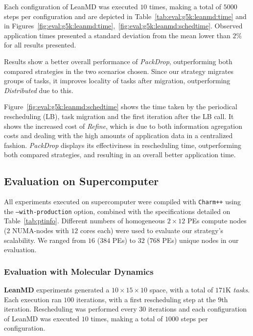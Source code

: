 Each configuration of LeanMD was executed $10$ times, making a total of $5000$ steps per configuration and are depicted in Table~\ref{tab:eval:g5k:leanmd:time} and in Figures~\ref{fig:eval:g5k:leanmd:time},~\ref{fig:eval:g5k:leanmd:schedtime}.
Observed application times presented a standard deviation from the mean lower than $2\%$ for all results presented.

Results show a better overall performance of \textit{PackDrop}, outperforming both compared strategies in the two scenarios chosen.
Since our strategy migrates groups of tasks, it improves locality of tasks after migration, outperforming \textit{Distributed} due to this.

Figure~\ref{fig:eval:g5k:leanmd:schedtime} shows the time taken by the periodical rescheduling (LB), task migration and the first iteration after the LB call.
It shows the increased cost of \textit{Refine}, which is due to both information agregation costs and dealing with the high amounts of application data in a centralized fashion.
\textit{PackDrop} displays its effectiviness in rescheduling time, outperforming both compared strategies, and resulting in an overall better application time. 

\subsection{Evaluation on Supercomputer}

All experiments executed on supercomputer were compiled with \texttt{Charm++} using the \texttt{--with-production} option, combined with the specifications detailed on Table~\ref{tab:ptinfo}.
Different numbers of homogeneous $2\times 12$ PEs compute nodes ($2$ NUMA-nodes with $12$ cores each) were used to evaluate our strategy's scalability.
We ranged from $16$ ($384$ PEs) to $32$ ($768$ PEs) unique nodes in our evaluation. 

\subsubsection*{Evaluation with Molecular Dynamics}

\textbf{LeanMD} experiments generated a $10\times15\times10$ space, with a total of $171$K \textit{tasks}.
Each execution ran $100$ iterations, with a first rescheduling step at the $9$th iteration. 
Rescheduling was performed every $30$ iterations and each configuration of LeanMD was executed $10$ times, making a total of $1000$ steps per configuration. 

